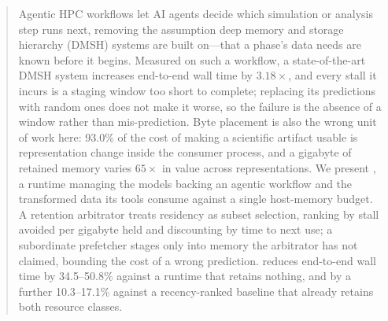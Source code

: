 %

\begin{abstract}
Agentic HPC workflows let AI agents decide which simulation or analysis step
runs next, removing the assumption deep memory and storage hierarchy (DMSH)
systems are built on---that a phase's data needs are known before it begins.
Measured on such a workflow, a state-of-the-art DMSH system increases
end-to-end wall time by $3.18\times$, and every stall it incurs is a staging
window too short to complete; replacing its predictions with random ones does
not make it worse, so the failure is the absence of a window rather than
mis-prediction. Byte placement is also the wrong unit of work here: 93.0\% of
the cost of making a scientific artifact usable is representation change
inside the consumer process, and a gigabyte of retained memory varies
$65\times$ in value across representations. We present \sysname, a runtime
managing the models backing an agentic workflow and the transformed data its
tools consume against a single host-memory budget. A retention arbitrator
treats residency as subset selection, ranking by stall avoided per gigabyte
held and discounting by time to next use; a subordinate prefetcher stages only
into memory the arbitrator has not claimed, bounding the cost of a wrong
prediction. \sysname{} reduces end-to-end wall time by 34.5--50.8\% against a
runtime that retains nothing, and by a further 10.3--17.1\% against a
recency-ranked baseline that already retains both resource classes.
\end{abstract}

